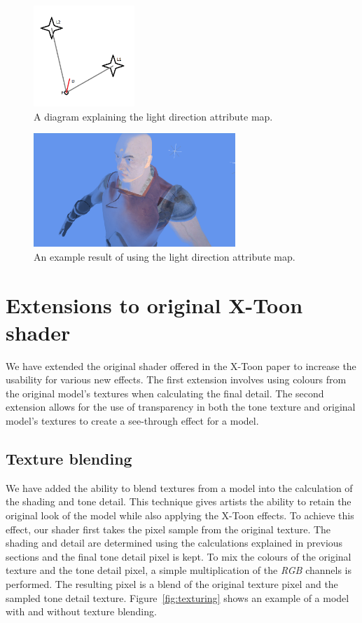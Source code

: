 \documentclass[annual]{acmsiggraph}
\begin{document}
\begin{figure}[h]
	\centering
	\includegraphics[width=1.5in]{images/light_detail}
	\caption{A diagram explaining the light direction attribute map.}
	\label{fig:lightDirection}
\end{figure}

\begin{figure}[h]
	\centering
	\includegraphics[width=3.0in]{images/light_directions}
	\caption{An example result of using the light direction attribute map.}
	\label{fig:lightDirectionResult}
\end{figure}

\section{Extensions to original X-Toon shader}
\label{sec:extensions}
We have extended the original shader offered in the X-Toon paper to increase the usability for various new effects. The first extension involves using colours from the original model's textures when calculating the final detail. The second extension allows for the use of transparency in both the tone texture and original model's textures to create a see-through effect for a model. 

\subsection{Texture blending}
\label{sec:blending}
We have added the ability to blend textures from a model into the calculation of the shading and tone detail. This technique gives artists the ability to retain the original look of the model while also applying the X-Toon effects. To achieve this effect, our shader first takes the pixel sample from the original texture. The shading and detail are determined using the calculations explained in previous sections and the final tone detail pixel is kept. To mix the colours of the original texture and the tone detail pixel, a simple multiplication of the {\it{RGB}} channels is performed. The resulting pixel is a blend of the original texture pixel and the sampled tone detail texture. Figure~\ref{fig:texturing} shows an example of a model with and without texture blending.
\end{document}
